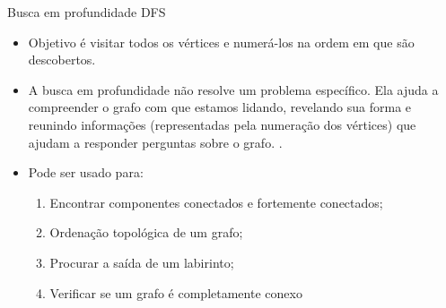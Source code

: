 \documentclass{if-beamer}
\begin{document}
\begin{frame}{Busca em profundidade DFS} 
	
	\justifying	

	\begin{itemize}
		\item Objetivo é visitar todos os vértices e numerá-los na ordem em que são descobertos.
		\item A busca em profundidade não resolve um problema específico.  Ela ajuda a compreender o grafo com que estamos lidando, revelando sua forma e reunindo informações (representadas pela numeração dos vértices) que ajudam a responder perguntas sobre o grafo. .
		\item Pode ser usado para:
		\begin{enumerate}
			\item  Encontrar componentes conectados e fortemente conectados;
			\item  Ordenação topológica de um grafo; 
			\item  Procurar a saída de um labirinto;
			\item  Verificar se um grafo é completamente conexo
		\end{enumerate}
	\end{itemize} 
\end{frame}
\end{document}
